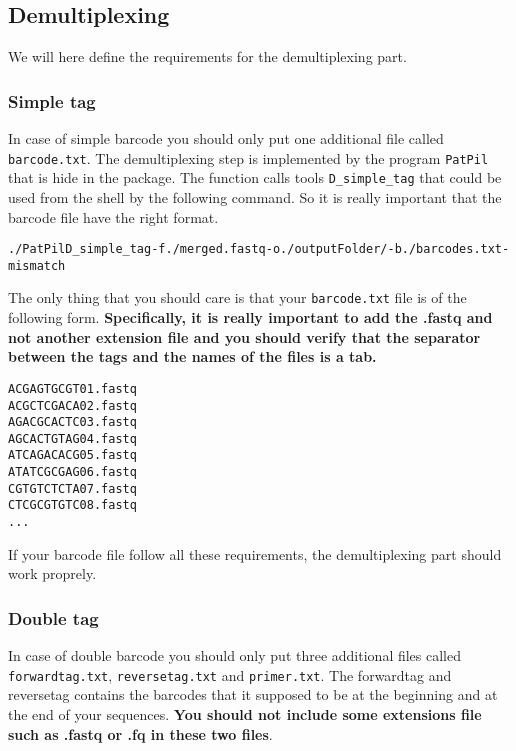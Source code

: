 \documentclass{article}\usepackage[]{graphicx}\usepackage[]{color}
\makeatletter
\newenvironment{kframe}{%
 \def\at@end@of@kframe{}%
 \ifinner\ifhmode%
  \def\at@end@of@kframe{\end{minipage}}%
  \begin{minipage}{\columnwidth}%
 \fi\fi%
 \def\FrameCommand##1{\hskip\@totalleftmargin \hskip-\fboxsep
 \colorbox{shadecolor}{##1}\hskip-\fboxsep
     \hskip-\linewidth \hskip-\@totalleftmargin \hskip\columnwidth}%
 \MakeFramed {\advance\hsize-\width
   \@totalleftmargin\z@ \linewidth\hsize
   \@setminipage}}%
 {\par\unskip\endMakeFramed%
 \at@end@of@kframe}
\newenvironment{knitrout}{}{} %
\makeatother
\begin{document}
\subsection{Demultiplexing}
\label{subsec:demux}
We will here define the requirements for the demultiplexing part.

\subsubsection{Simple tag}
 In case of simple barcode you should only put one additional file called \texttt{barcode.txt}. The demultiplexing step is implemented by the program \texttt{PatPil} that is hide in the package. The function calls tools \texttt{D\_simple\_tag} that could be used from the shell by the following command. So it is really important that the barcode file have the right format.

\begin{knitrout}\footnotesize
{}\color{fgcolor}\begin{kframe}
\begin{alltt}
./PatPil D_simple_tag -f ./merged.fastq -o ./outputFolder/ -b ./barcodes.txt -mismatch
\end{alltt}
\end{kframe}
\end{knitrout}

The only thing that you should care is that your \texttt{barcode.txt} file is of the following form. \textbf{Specifically, it is really important to add the .fastq and not another extension file and you should verify that the separator between the tags and the names of the files is a tab.}

\begin{knitrout}
\color{fgcolor}\begin{kframe}
\begin{alltt}
ACGAGTGCGT	01.fastq
ACGCTCGACA	02.fastq
AGACGCACTC	03.fastq
AGCACTGTAG	04.fastq
ATCAGACACG	05.fastq
ATATCGCGAG	06.fastq
CGTGTCTCTA	07.fastq
CTCGCGTGTC	08.fastq
...
\end{alltt}
\end{kframe}
\end{knitrout}

If your barcode file follow all these requirements, the demultiplexing part should work proprely.

\subsubsection{Double tag}
 In case of double barcode you should only put three additional files called \texttt{forwardtag.txt},
 \texttt{reversetag.txt} and \texttt{primer.txt}. The forwardtag and reversetag contains the barcodes that it supposed to be at the beginning and at the end of your sequences. \textbf{You should not include some extensions file such as .fastq or .fq in these two files}.
\end{document}
